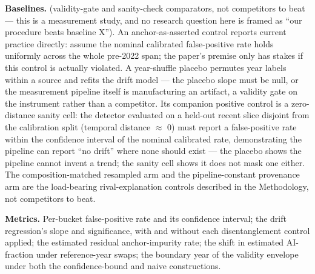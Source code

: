 \documentclass[conference]{IEEEtran}
\begin{document}
\smallskip\noindent\textbf{Baselines.}  (validity-gate and sanity-check comparators, not competitors to beat --- this is a measurement study, and no research question here is framed as ``our procedure beats baseline X''). An anchor-as-asserted control reports current practice directly: assume the nominal calibrated false-positive rate holds uniformly across the whole pre-2022 span; the paper's premise only has stakes if this control is actually violated. A year-shuffle placebo permutes year labels within a source and refits the drift model --- the placebo slope must be null, or the measurement pipeline itself is manufacturing an artifact, a validity gate on the instrument rather than a competitor. Its companion positive control is a zero-distance sanity cell: the detector evaluated on a held-out recent slice disjoint from the calibration split (temporal distance $\approx$ 0) must report a false-positive rate within the confidence interval of the nominal calibrated rate, demonstrating the pipeline can report ``no drift'' where none should exist --- the placebo shows the pipeline cannot invent a trend; the sanity cell shows it does not mask one either. The composition-matched resampled arm and the pipeline-constant provenance arm are the load-bearing rival-explanation controls described in the Methodology, not competitors to beat.

\smallskip\noindent\textbf{Metrics.}  Per-bucket false-positive rate and its confidence interval; the drift regression's slope and significance, with and without each disentanglement control applied; the estimated residual anchor-impurity rate; the shift in estimated AI-fraction under reference-year swaps; the boundary year of the validity envelope under both the confidence-bound and naive constructions.
\end{document}
